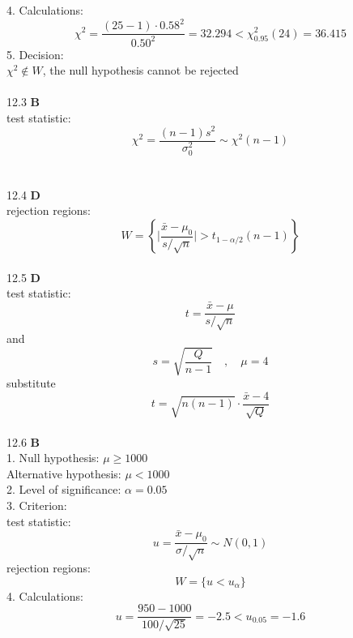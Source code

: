 \documentclass[a4paper]{ctexart}    %
\begin{document}
	4. Calculations:
	\begin{equation*}
		\chi^2 = \frac{(25 - 1) \cdot 0.58^2}{0.50^2} = 32.294 < \chi_{0.95}^2(24) = 36.415
	\end{equation*}
	5. Decision: \\
	$ \chi^2 \notin W $, the null hypothesis cannot be rejected \\ \\
	12.3 \quad \textbf{B} \\
	test statistic: 
	\begin{equation*}
		\chi^2 = \frac{(n-1)s^2}{\sigma_0^2} \sim \chi^2(n-1) 
	\end{equation*} \\ \\
	12.4 \quad \textbf{D} \\
	rejection regions:
	\begin{equation*}
		W = \left\{ \bigg|\frac{\bar{x} - \mu_0}{s/\sqrt{n}}\bigg| > t_{1-\alpha/2}(n-1) \right\}
	\end{equation*} \\
	12.5 \quad \textbf{D} \\
	test statistic:
	\begin{equation*}
		t = \frac{\bar{x} - \mu}{s / \sqrt{n}}
	\end{equation*}
	and
	\begin{equation*}
		s = \sqrt{\frac{Q}{n-1}} \quad , \quad \mu = 4
	\end{equation*}
	substitute
	\begin{equation*}
		t = \sqrt{n(n-1)} \cdot \frac{\bar{x} - 4}{\sqrt{Q}}
	\end{equation*} \\
	12.6 \quad \textbf{B} \\
	1. Null hypothesis: $ \mu \geq 1000 $ \\
	Alternative hypothesis: $ \mu < 1000 $ \\
	2. Level of significance: $ \alpha = 0.05 $ \\
	3. Criterion: \\
	test statistic:
	\begin{equation*}
		u = \frac{\bar{x} - \mu_0}{\sigma / \sqrt{n}} \sim N(0, 1)
	\end{equation*}
	rejection regions:
	\begin{equation*}
		W = \{u < u_{\alpha}\}
	\end{equation*}
	4. Calculations:
	\begin{equation*}
		u = \frac{950 - 1000}{100 / \sqrt{25}} = -2.5 < u_{0.05} = -1.6
	\end{equation*}
\end{document}
